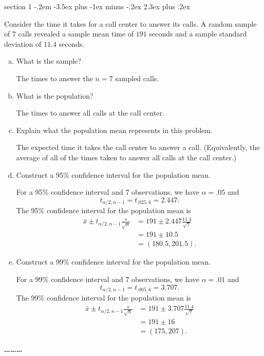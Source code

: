 \documentclass[answers,11pt]{exam}
\makeatletter
\newenvironment{problem}{\@startsection
       {section}
       {1}
       {-.2em}
       {-3.5ex plus -1ex minus -.2ex}
       {2.3ex plus .2ex}
       {\pagebreak[3]%
       \large\bf\noindent{Problem }
       }
       }
       {%
       \begin{center}\large\bf \ldots\ldots\ldots\end{center}}
\makeatother
\begin{document}
\begin{problem}{}

Consider the time it takes for a call center to answer its calls. A random
sample of $7$ calls revealed a sample mean time of $191$ seconds and a sample
standard deviation of $11.4$ seconds.

\begin{enumerate}[(a)]

\item What is the sample?
    \begin{solution}
        The times to answer the $n = 7$ sampled calls.
    \end{solution}
\item What is the population?
    \begin{solution}
The times to answer all calls at the call center.
    \end{solution}
\item Explain what the population mean represents in this problem.
    \begin{solution}
The expected time it takes the call center to answer a call.  (Equivalently,
the average of all of the times taken to answer all calls at the call center.)
    \end{solution}
\item Construct a 95\% confidence interval for the population mean.
    \begin{solution}
For a 95\% confidence interval and $7$ observations, we have $\alpha = .05$
and
\[
  t_{\alpha/2,n-1} = t_{.025,6} = 2.447.
\]
The 95\% confidence interval for the population mean is
\begin{align*}
  \bar x \pm t_{\alpha/2,n-1} \frac{s}{\sqrt{n}}
    &= 191 \pm 2.447 \frac{11.4}{\sqrt{7}} \\
    &= 191 \pm 10.5 \\
    &= (180.5, 201.5).
\end{align*}

    \end{solution}

\item Construct a 99\% confidence interval for the population mean.
    \begin{solution}
For a 99\% confidence interval and $7$ observations, we have $\alpha = .01$
and
\[
  t_{\alpha/2,n-1} = t_{.005,6} = 3.707.
\]
The 99\% confidence interval for the population mean is
\begin{align*}
  \bar x \pm t_{\alpha/2,n-1} \frac{s}{\sqrt{n}}
    &= 191 \pm 3.707 \frac{11.4}{\sqrt{7}} \\
    &= 191 \pm 16 \\
    &= (175, 207).
\end{align*}
    \end{solution}


\end{enumerate}
\end{problem}
\end{document}
